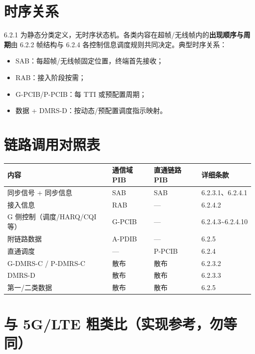 \documentclass[11pt,a4paper]{ctexart}
\begin{document}
\section{时序关系}

6.2.1 为静态分类定义，无时序状态机。各类内容在超帧/无线帧内的\textbf{出现顺序与周期}由 6.2.2 帧结构与 6.2.4 各控制信息调度规则共同决定。典型时序关系：
\begin{itemize}[nosep]
  \item SAB：每超帧/无线帧固定位置，终端首先接收；
  \item RAB：接入阶段按需；
  \item G-PCIB/P-PCIB：每 TTI 或预配置周期；
  \item 数据 + DMRS-D：按动态/预配置调度指示映射。
\end{itemize}

\section{链路调用对照表}

\begin{table}[h]
\centering
\footnotesize
\begin{tabular}{p{3.5cm}p{2.5cm}p{2.5cm}p{5cm}}
\toprule
\textbf{内容} & \textbf{通信域 PIB} & \textbf{直通链路 PIB} & \textbf{详细条款} \\
\midrule
同步信号 + 同步信息 & SAB & SAB & 6.2.3.1、6.2.4.1 \\
接入信息 & RAB & --- & 6.2.4.2 \\
G 侧控制（调度/HARQ/CQI 等） & G-PCIB & --- & 6.2.4.3\textasciitilde 6.2.4.10 \\
附链路数据 & A-PDIB & --- & 6.2.5 \\
直通调度 & --- & P-PCIB & 6.2.4 \\
G-DMRS-C / P-DMRS-C & 散布 & 散布 & 6.2.3.2 \\
DMRS-D & 散布 & 散布 & 6.2.3.3 \\
第一/二类数据 & 散布 & 散布 & 6.2.5 \\
\bottomrule
\end{tabular}
\end{table}

\section{与 5G/LTE 粗类比（实现参考，勿等同）}
\end{document}
